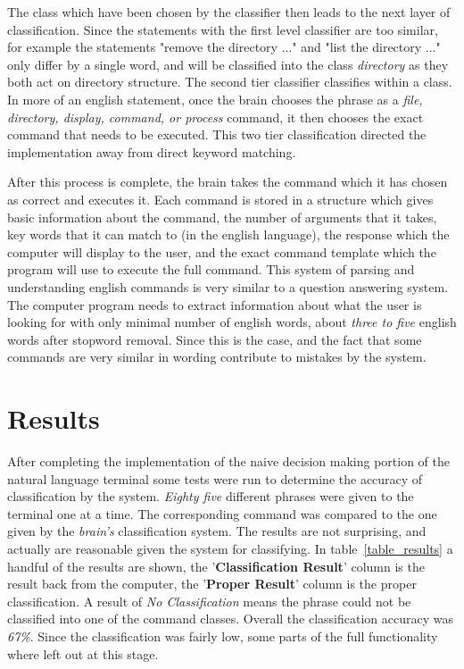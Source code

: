 \documentclass[12pt]{article}
\begin{document}
The class which have been chosen by the classifier then leads to the next layer of classification. Since the statements with the first level classifier are too similar, for example the statements "remove the directory ..." and "list the directory ..." only differ by a single word, and will be classified into the class {\it directory} as they both act on directory structure. The second tier classifier classifies within a class. In more of an english statement, once the brain chooses the phrase as a {\it file, directory, display, command, or process} command, it then chooses the exact command that needs to be executed. This two tier classification directed the implementation away from direct keyword matching.

After this process is complete, the brain takes the command which it has chosen as correct and executes it. Each command is stored in a structure which gives basic information about the command, the number of arguments that it takes, key words that it can match to (in the english language), the response which the computer will display to the user, and the exact command template which the program will use to execute the full command. This system of parsing and understanding english commands is very similar to a question answering system.\cite{aggarwal} The computer program needs to extract information about what the user is looking for with only minimal number of english words, about {\it three to five} english words after stopword removal. Since this is the case, and the fact that some commands are very similar in wording contribute to mistakes by the system.

\section{Results}
\label{Results}

After completing the implementation of the naive decision making portion of the natural language terminal some tests were run to determine the accuracy of classification by the system. {\it Eighty five} different phrases were given to the terminal one at a time. The corresponding command was compared to the one given by the {\it brain's} classification system. The results are not surprising, and actually are reasonable given the system for classifying. In table~\ref{table_results} a handful of the results are shown, the '\textbf{Classification Result}' column is the result back from the computer, the '\textbf{Proper Result}' column is the proper classification. A result of {\it No Classification} means the phrase could not be classified into one of the command classes. Overall the classification accuracy was {\it 67\%}. Since the classification was fairly low, some parts of the full functionality where left out at this stage.
\end{document}
